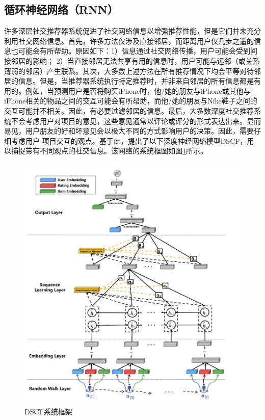 \subsection{循环神经网络（RNN）}
许多深层社交推荐器系统促进了社交网络信息以增强推荐性能，但是它们并未充分利用社交网络信息。首先，许多方法仅涉及直接邻居，而距离用户仅几步之遥的信息也可能会有所帮助。原因如下：1）信息通过社交网络传播，用户可能会受到间接邻居的影响； 2）当直接邻居无法共享有用的信息时，用户可能与远​​邻（或关系薄弱的邻居）产生联系。其次，大多数上述方法在所有推荐情况下均会平等对待邻居的信息。但是，当推荐器系统执行特定推荐时，并非来自邻居的所有信息都是有用的。例如，当预测用户是否将购买iPhone时，他/她的朋友与iPhone或其他与iPhone相关的物品之间的交互可能会有所帮助，而他/她的朋友与Nike鞋子之间的交互可能并不相关。因此，有必要过滤邻居的信息。最后，大多数深度社交推荐系统不会考虑用户对项目的意见，这些意见通常以评论或评分的形式表达出来。显而易见，用户朋友的好和坏意见会以极大不同的方式影响用户的决策。因此，需要仔细考虑用户-项目交互的观点。基于此，提出了以下深度神经网络模型DSCF\cite{fan2019deep}，用以捕捉带有不同观点的社交信息。该网络的系统框图如图\ref{fig2}所示。

\begin{figure}
    \includegraphics[width=0.9\linewidth]{dpfig/fig2.JPG}
    \caption{DSCF系统框架}
    \label{fig2}
\end{figure}

